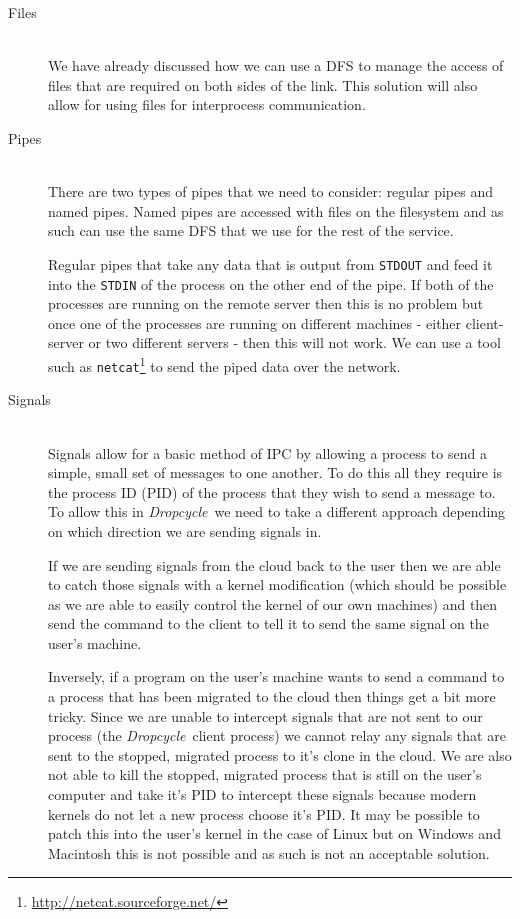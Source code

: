 \documentclass[12pt, a4paper]{article}
\def\dropcycle{\emph{Dropcycle}\ }
\begin{document}
\begin{description}

	\item[Files] \\

	We have already discussed how we can use a DFS to manage the access of
	files that are required on both sides of the link. This solution will also
	allow for using files for interprocess communication.

	\item[Pipes] \\

	There are two types of pipes that we need to consider: regular pipes and
	named pipes. Named pipes are accessed with files on the filesystem and as
	such can use the same DFS that we use for the rest of the service.

	Regular pipes that take any data that is output from \texttt{STDOUT} and
	feed it into the \texttt{STDIN} of the process on the other end of the
	pipe. If both of the processes are running on the remote server then this
	is no problem but once one of the processes are running on different
	machines - either client-server or two different servers - then this will
	not work. We can use a tool such as
	\texttt{netcat}\footnote{\url{http://netcat.sourceforge.net/}} to send the
	piped data over the network.

	\item[Signals] \\

	Signals allow for a basic method of IPC by allowing a process to send
	a simple, small set of messages to one another. To do this all they require
	is the process ID (PID) of the process that they wish to send a message to.
	To allow this in \dropcycle we need to take a different approach depending
	on which direction we are sending signals in.

	If we are sending signals from the cloud back to the user then we are able
	to catch those signals with a kernel modification (which should be possible
	as we are able to easily control the kernel of our own machines) and then
	send the command to the client to tell it to send the same signal on the
	user's machine.

	Inversely, if a program on the user's machine wants to send a command to
	a process that has been migrated to the cloud then things get a bit more
	tricky. Since we are unable to intercept signals that are not sent to our
	process (the \dropcycle client process) we cannot relay any signals that
	are sent to the stopped, migrated process to it's clone in the cloud. We
	are also not able to kill the stopped, migrated process that is still on
	the user's computer and take it's PID to intercept these signals because
	modern kernels do not let a new process choose it's PID\@. It may be
	possible to patch this into the user's kernel in the case of Linux but on
	Windows and Macintosh this is not possible and as such is not an acceptable
	solution.


\end{description}
\end{document}

